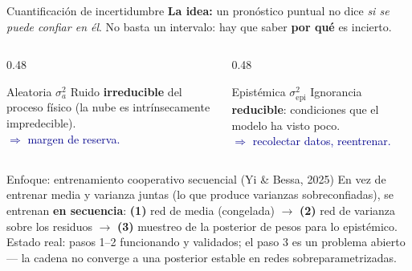 \documentclass[10pt,aspectratio=169]{beamer}
\begin{document}
\begin{frame}{Cuantificación de incertidumbre}
  \textbf{La idea:} un pronóstico puntual no dice \emph{si se puede confiar en él}.
  No basta un intervalo: hay que saber \textbf{por qué} es incierto.

  \vspace{0.4em}
  \begin{columns}[T]
    \begin{column}{0.48\textwidth}
      \begin{block}{Aleatoria $\sigma_a^2$}
        \small
        Ruido \textbf{irreducible} del proceso físico (la nube es
        intrínsecamente impredecible).\\[0.2em]
        \textcolor{darkblue}{$\Rightarrow$ margen de reserva.}
      \end{block}
    \end{column}
    \begin{column}{0.48\textwidth}
      \begin{block}{Epistémica $\sigma_\text{epi}^2$}
        \small
        Ignorancia \textbf{reducible}: condiciones que el modelo ha visto poco.\\[0.2em]
        \textcolor{darkblue}{$\Rightarrow$ recolectar datos, reentrenar.}
      \end{block}
    \end{column}
  \end{columns}

  \vspace{0.4em}
  \begin{block}{Enfoque: entrenamiento cooperativo secuencial (Yi \& Bessa, 2025)}
    \small
    En vez de entrenar media y varianza juntas (lo que produce varianzas
    sobreconfiadas), se entrenan \textbf{en secuencia}:
    \textbf{(1)} red de media (congelada) $\to$
    \textbf{(2)} red de varianza sobre los residuos $\to$
    \textbf{(3)} muestreo de la posterior de pesos para lo epistémico.\\[0.3em]
    \footnotesize
    \textcolor{warnred}{Estado real:} pasos 1--2 funcionando y validados; el paso 3
    es un problema abierto --- la cadena no converge a una posterior estable en
    redes sobreparametrizadas.
  \end{block}
\end{frame}
\end{document}

